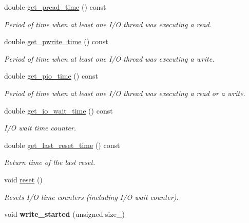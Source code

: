 \begin{CompactItemize}
double \hyperlink{group__iolayer_g8dce58f17e3ef7d8465b097a72f0a781}{get\_\-pread\_\-time} () const 
\begin{CompactList}\small\item\em Period of time when at least one I/O thread was executing a read. \item\end{CompactList}\item 
double \hyperlink{group__iolayer_gd9f7e56d99697abdca76f1ef1ea1ff00}{get\_\-pwrite\_\-time} () const 
\begin{CompactList}\small\item\em Period of time when at least one I/O thread was executing a write. \item\end{CompactList}\item 
double \hyperlink{group__iolayer_g70efd6899577c26be66ad527c6776c44}{get\_\-pio\_\-time} () const 
\begin{CompactList}\small\item\em Period of time when at least one I/O thread was executing a read or a write. \item\end{CompactList}\item 
double \hyperlink{group__iolayer_gfb84d41b01e495224d1e0033386ee55c}{get\_\-io\_\-wait\_\-time} () const 
\begin{CompactList}\small\item\em I/O wait time counter. \item\end{CompactList}\item 
double \hyperlink{group__iolayer_g536af25232d9f9f65e64fbf480b37846}{get\_\-last\_\-reset\_\-time} () const 
\begin{CompactList}\small\item\em Return time of the last reset. \item\end{CompactList}\item 
\hypertarget{group__iolayer_g4b34c969ba2786ae1c29eb01708c2572}{
void \hyperlink{group__iolayer_g4b34c969ba2786ae1c29eb01708c2572}{reset} ()}
\label{group__iolayer_g4b34c969ba2786ae1c29eb01708c2572}

\begin{CompactList}\small\item\em Resets I/O time counters (including I/O wait counter). \item\end{CompactList}\item 
\hypertarget{group__iolayer_gf87dff3952823db0588ead65b2af0b3f}{
void \textbf{write\_\-started} (unsigned size\_\-)}
\label{group__iolayer_gf87dff3952823db0588ead65b2af0b3f}


\end{CompactItemize}

